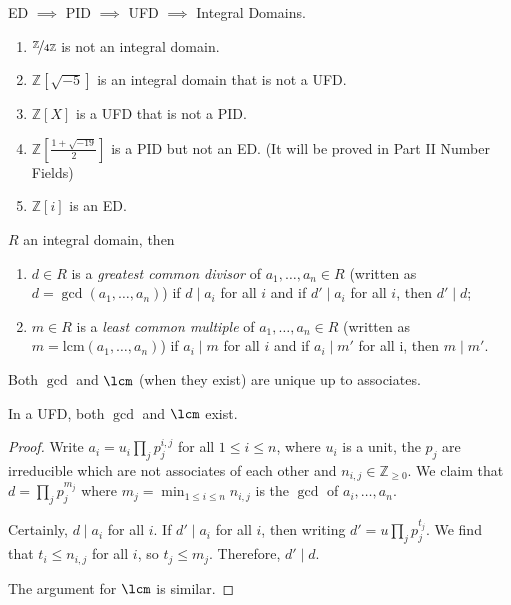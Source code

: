 \begin{example}
    ED \(\implies\) PID \(\implies\) UFD \(\implies\) Integral Domains.
    \begin{enumerate}
        \item \(\nicefrac{\mathbb{Z}}{4\mathbb{Z}}\) is not an integral domain.
        \item \(\mathbb{Z}[\sqrt{-5}]\) is an integral domain that is not a UFD.
        \item \(\mathbb{Z}[X]\) is a UFD that is not a PID.
        \item \(\mathbb{Z}[\frac{1 + \sqrt{-19} }{2}]\) is a PID but not an ED. (It will be proved in Part II Number Fields)
        \item \(\mathbb{Z}[i]\) is an ED.
    \end{enumerate} 
    \begin{definition}
        \(R\) an integral domain, then
        \begin{enumerate}
            \item \(d \in R\) is a \textit{greatest common divisor} of \(a_1, \ldots,a_n \in R\) (written as \(d = \gcd(a_1, \ldots, a_n)\)) if \(d \mid a_i\) for all \(i\) and if \(d' \mid a_i\) for all \(i\), then \(d'\mid d\);
            \item \(m \in R\) is a \textit{least common multiple} of \(a_1, \ldots,a_n \in R\) (written as \(m = \mathrm{lcm}(a_1, \ldots,a_n)\)) if \(a_i \mid m\) for all \(i\) and if \(a_i \mid m'\) for all i, then \(m \mid m'\).
        \end{enumerate}
        Both \(\gcd\) and \(\lcm\) (when they exist) are unique up to associates.
    \end{definition}
\end{example}
\begin{proposition}
    In a UFD, both \(\gcd\) and \(\lcm\) exist.
\end{proposition}
\begin{proof}
    Write \(a_i = u_i \prod\limits_{j}p_j^{i,j}\) for all \(1 \leq i \leq n\), where \(u_i\) is a unit, the \(p_j\) are irreducible which are not associates of each other and \(n_{i,j} \in \mathbb{Z}_{\geq 0}\). We claim that \(d = \prod_j p_j ^{m_j}\) where \(m_j = \mathop{\min}_{1\leq i\leq n}n_{i,j}\) is the \(\gcd\) of \(a_i, \ldots, a_n\).

    Certainly, \(d \mid a_i\) for all \(i\). If \(d' \mid a_{i}\) for all \(i\), then writing \(d' = u \prod_j p_j^{t_j}\). We find that \(t_i \leq n_{i,j}\) for all \(i\), so \(t_j \leq m_j\). Therefore, \(d' \mid d\).

    The argument for \(\lcm\) is similar.
\end{proof}